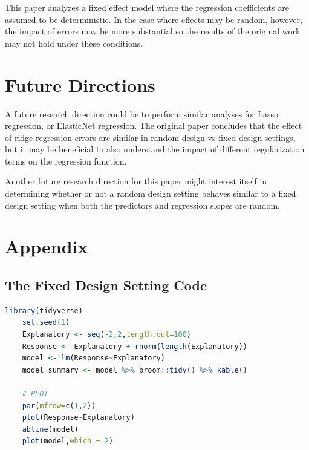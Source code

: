 \documentclass[nohyperref]{article}
\theoremstyle{plain}
\theoremstyle{definition}
\theoremstyle{remark}
\begin{document}
This paper analyzes a fixed effect model where the regression coefficients are assumed to be deterministic. In the case where effects may be random, however, the impact of errors may be more substantial so the results of the original work may not hold under these conditions.

\section{Future Directions}
A future research direction could be to perform similar analyses for Lasso regression, or ElasticNet regression. The original paper concludes that the effect of ridge regression errors are similar in random design vs fixed design settings, but it may be beneficial to also understand the impact of different regularization terms on the regression function. 

Another future research direction for this paper might interest itself in determining whether or not a random design setting behaves similar to a fixed design setting when both the predictors and regression slopes are random. 





\newpage
\onecolumn
\nocite{RT2017}








\appendix
\onecolumn
\section{Appendix}

\subsection{The Fixed Design Setting Code}
\label{code:fixed}
\begin{lstlisting}[language=R]
    library(tidyverse)
    set.seed(1)
    Explanatory <- seq(-2,2,length.out=100)
    Response <- Explanatory + rnorm(length(Explanatory))
    model <- lm(Response~Explanatory)
    model_summary <- model %>% broom::tidy() %>% kable()
    
    # PLOT 
    par(mfrow=c(1,2))
    plot(Response~Explanatory)
    abline(model)
    plot(model,which = 2)
\end{lstlisting}
\end{document}
